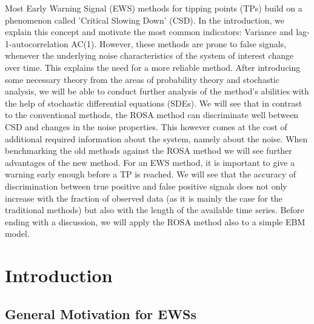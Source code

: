 \documentclass[%
thesis=student,%
coverpage=false,%
titlepage=false,%
headmarks=true, %
english,%
font=libertine, %
math=newpxtx, %
BCOR=5mm,%
coverBCOR=11mm%
]{tumbook}
\begin{document}
Most Early Warning Signal (EWS) methods for tipping points (TPs) build on a phenomenon called 'Critical Slowing Down' (CSD). In the introduction, we explain this concept and motivate the most common indicators: Variance and lag-1-autocorrelation AC(1). However, these methods are prone to false signals, whenever the underlying noise characteristics of the system of interest change over time. This explains the need for a more reliable method. After introducing some necessary theory from the areas of probability theory and stochastic analysis, we will be able to conduct further analysis of the method's abilities with the help of stochastic differential equations (SDEs).
We will see that in contrast to the conventional methods, the ROSA method can discriminate well between CSD and changes in the noise properties. This however comes at the cost of additional required information about the system, namely about the noise. When benchmarking the old methods against the ROSA method we will see further advantages of the new method. For an EWS method, it is important to give a warning early enough before a TP is reached. We will see that the accuracy of discrimination between true positive and false positive signals does not only increase with the fraction of observed data (as it is mainly the case for the traditional methods) but also with the length of the available time series. Before ending with a discussion, we will apply the ROSA method also to a simple EBM model.



\cleardoublepage{}

\tableofcontents

\mainmatter{}
\chapter{Introduction}

\section{General Motivation for EWSs}
\label{sec:General  Motivation for EWS}
\end{document}
